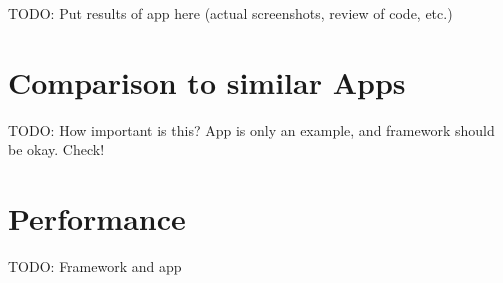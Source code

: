 TODO: Put results of app here (actual screenshots, review of code, etc.)

\section{Comparison to similar Apps}

TODO: How important is this?
App is only an example, and framework should be okay.
Check!

\section{Performance}

TODO: Framework and app
